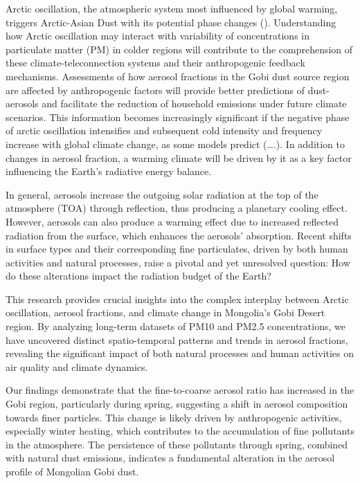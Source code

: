 \documentclass[
  11pt,
]{article}
\begin{document}
Arctic oscillation, the atmospheric system most influenced by global
warming, triggers Arctic-Asian Dust with its potential phase changes ().
Understanding how Arctic oscillation may interact with variability of
concentrations in particulate matter (PM) in colder regions will
contribute to the comprehension of these climate-teleconnection systems
and their anthropogenic feedback mechanisms. Assessments of how aerosol
fractions in the Gobi dust source region are affected by anthropogenic
factors will provide better predictions of dust-aerosols and facilitate
the reduction of household emissions under future climate scenarios.
This information becomes increasingly significant if the negative phase
of arctic oscillation intensifies and subsequent cold intensity and
frequency increase with global climate change, as some models predict
(\ldots.). In addition to changes in aerosol fraction, a warming climate
will be driven by it as a key factor influencing the Earth's radiative
energy balance.

In general, aerosols increase the outgoing solar radiation at the top of
the atmosphere (TOA) through reflection, thus producing a planetary
cooling effect. However, aerosols can also produce a warming effect due
to increased reflected radiation from the surface, which enhances the
aerosols' absorption. Recent shifts in surface types and their
corresponding fine particulates, driven by both human activities and
natural processes, raise a pivotal and yet unresolved question: How do
these alterations impact the radiation budget of the Earth?

This research provides crucial insights into the complex interplay
between Arctic oscillation, aerosol fractions, and climate change in
Mongolia's Gobi Desert region. By analyzing long-term datasets of PM10
and PM2.5 concentrations, we have uncovered distinct spatio-temporal
patterns and trends in aerosol fractions, revealing the significant
impact of both natural processes and human activities on air quality and
climate dynamics.

Our findings demonstrate that the fine-to-coarse aerosol ratio has
increased in the Gobi region, particularly during spring, suggesting a
shift in aerosol composition towards finer particles. This change is
likely driven by anthropogenic activities, especially winter heating,
which contributes to the accumulation of fine pollutants in the
atmosphere. The persistence of these pollutants through spring, combined
with natural dust emissions, indicates a fundamental alteration in the
aerosol profile of Mongolian Gobi dust.
\end{document}
